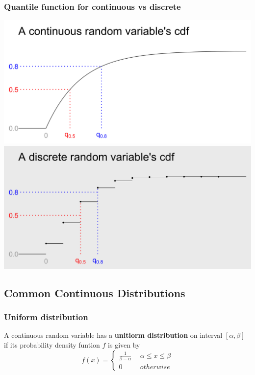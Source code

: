 \documentclass{article}
\begin{document}
\subsubsection{Quantile function for continuous vs discrete}
\begin{center}
\includegraphics[scale=.15]{crvqf.png}
\includegraphics[scale=.15]{drvqf.png}
\end{center}
\subsection{Common Continuous Distributions}
\subsubsection{Uniform distribution}
\begin{definition}
A continuous random variable has a \textbf{unitiorm distribution} on interval $[\alpha, \beta]$ if its probability density funtion $f$ is given by\\
\begin{equation}
f(x) =
\begin{cases}
\frac{1}{\beta -\alpha} \ \ &\alpha \leq x \leq \beta\\
0 \ \ &otherwise
\end{cases}
\end{equation}
\end{definition}
\end{document}

